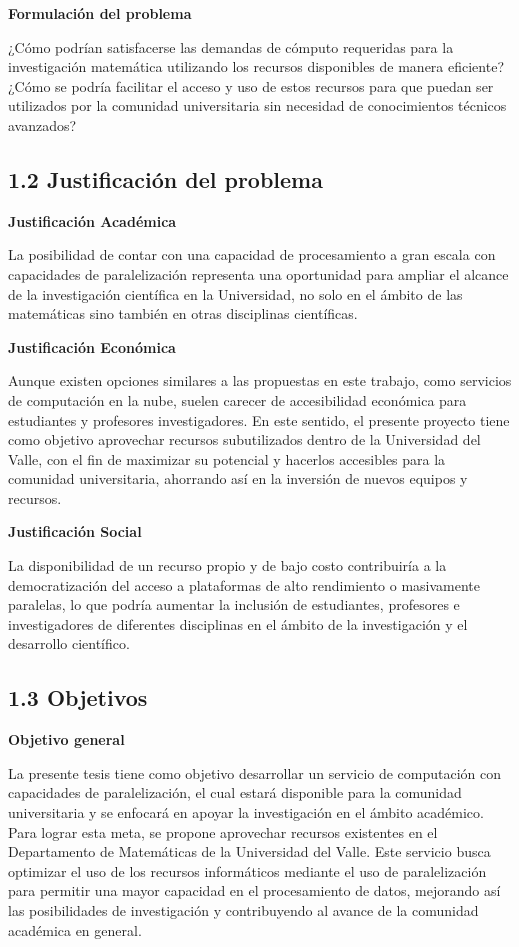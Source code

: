 \begin{spacing}{1.5}
  \textbf{Formulación del problema}

  ¿Cómo podrían satisfacerse las demandas de cómputo requeridas para la investigación matemática utilizando los recursos disponibles de manera eficiente?
  ¿Cómo se podría facilitar el acceso y uso de estos recursos para que puedan ser utilizados por la comunidad universitaria sin necesidad de conocimientos técnicos avanzados?

  \subsection{1.2 Justificación del problema}

  \textbf{Justificación Académica}

  La posibilidad de contar con una capacidad de procesamiento a gran escala con capacidades de paralelización representa una oportunidad para ampliar el alcance de la investigación científica en la Universidad, no solo en el ámbito de las matemáticas sino también en otras disciplinas científicas.

  \textbf{Justificación Económica}

  Aunque existen opciones similares a las propuestas en este trabajo, como servicios de computación en la nube, suelen carecer de accesibilidad económica para estudiantes y profesores investigadores. En este sentido, el presente proyecto tiene como objetivo aprovechar recursos subutilizados dentro de la Universidad del Valle, con el fin de maximizar su potencial y hacerlos accesibles para la comunidad universitaria, ahorrando así en la inversión de nuevos equipos y recursos.

  \textbf{Justificación Social}

  La disponibilidad de un recurso propio y de bajo costo contribuiría a la democratización del acceso a plataformas de alto rendimiento o masivamente paralelas, lo que podría aumentar la inclusión de estudiantes, profesores e investigadores de diferentes disciplinas en el ámbito de la investigación y el desarrollo científico.

  \subsection{1.3 Objetivos}

  \textbf{Objetivo general}

  La presente tesis tiene como objetivo desarrollar un servicio de computación con capacidades de paralelización, el cual estará disponible para la comunidad universitaria y se enfocará en apoyar la investigación en el ámbito académico. Para lograr esta meta, se propone aprovechar recursos existentes en el Departamento de Matemáticas de la Universidad del Valle. Este servicio busca optimizar el uso de los recursos informáticos mediante el uso de paralelización para permitir una mayor capacidad en el procesamiento de datos, mejorando así las posibilidades de investigación y contribuyendo al avance de la comunidad académica en general.


\end{spacing}
